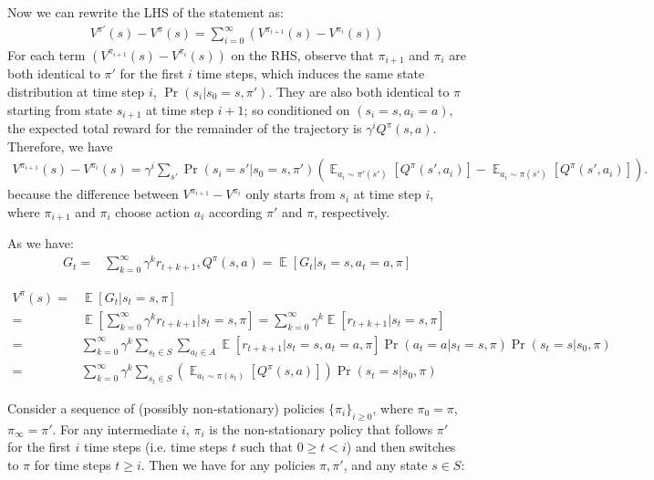 \documentclass[11pt]{article}
\theoremstyle{case}
\DeclareMathOperator{\E}{\mathbb{E}}
\begin{document}
\begin{enumerate}[label=(\alph*)]
Now we can rewrite the LHS of the statement as:
\begin{align*}
   V^{\pi'}(s) - V^{\pi}(s) = \sum_{i=0}^{\infty} (V^{\pi_{i+1}}(s) - V^{\pi_{i}}(s))
\end{align*}
For each term $(V^{\pi_{i+1}}(s) - V^{\pi_{i}}(s))$ on the RHS, observe that $\pi_{i+1}$ and  $\pi_{i}$ are both identical to $\pi'$ for the first $i$ time steps, which induces the same state distribution at time step $i$, $\Pr(s_i|s_0=s, \pi')$.
They are also both identical to $\pi$ starting from state $s_{i+1}$ at time step $i+1$; so conditioned on $(s_i=s, a_i=a)$, the expected total reward for the remainder of the trajectory is $\gamma^i Q^\pi(s,a)$. Therefore, we have
\begin{align*}
    V^{\pi_{i+1}}(s) - V^{\pi_{i}}(s) = \gamma^i \sum_{s'}\Pr(s_i=s'|s_0=s, \pi')(\E_{a_i\sim \pi'(s')}[Q^\pi(s',a_i)]-\E_{a_i\sim \pi(s')}[Q^\pi(s',a_i)]).
\end{align*}
because the difference between $V^{\pi_{i+1}} - V^{\pi_{i}}$ only starts from $s_i$ at time step $i$, where $\pi_{i+1}$ and $\pi_{i}$ choose action $a_i$ according $\pi'$ and $\pi$, respectively.

\begin{shaded}
As we have:
\begin{align*}
G_t = & \sum_{k=0}^{\infty} \gamma^k r_{t+k+1},Q^{\pi}(s,a) =  \E[G_t | s_t = s,a_t = a,\pi]
\end{align*}

\begin{align*}
V^{\pi}(s) = & \E[G_t | s_t = s,\pi ]\\
				= &  \E[\sum_{k=0}^{\infty} \gamma^k r_{t+k+1} | s_t = s,\pi ] =  \sum_{k=0}^{\infty} \gamma^k \E[ r_{t+k+1} | s_t = s,\pi ] \\
			= & \sum_{k=0}^{\infty} \gamma^k \sum_{s_t \in S} \sum_{a_t \in A} \E[ r_{t+k+1} | s_t = s,a_t = a,\pi ]\Pr(a_t = a|s_t = s,\pi) \Pr(s_t = s|s_0,\pi)\\
		   = & \sum_{k=0}^{\infty} \gamma^k  \sum_{s_t \in S} (\E_{a_t\sim \pi(s_t)}[Q^\pi(s,a)]) \Pr(s_t=s|s_0, \pi)
\end{align*}

Consider a sequence of (possibly non-stationary) policies $\{\pi_i\}_{i\geq0}$, where $\pi_0=\pi$, $\pi_\infty=\pi'$. For any intermediate $i$, $\pi_i$ is the non-stationary policy that follows $\pi'$ for the first $i$ time steps (i.e. time steps $t$ such that $0 \geq t <i$) and then switches to $\pi$ for time steps $t\geq i$. Then we have for any policies $\pi, \pi'$, and any state $s\in S$:\\
\end{shaded}


\end{enumerate}
\end{document}
